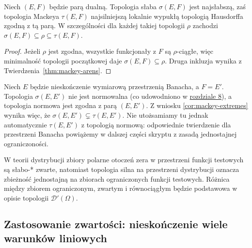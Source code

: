 \begin{wniosek}\label{cor:mackey-extremes}
Niech $(E,F)$ będzie parą dualną. Topologia słaba
$\sigma(E,F)$ jest najsłabszą, zaś topologia Mackeya
$\tau(E,F)$ najsilniejszą lokalnie wypukłą topologią
Hausdorffa zgodną z tą parą. W szczególności dla każdej
takiej topologii $\rho$ zachodzi
$\sigma(E,F)\subseteq\rho\subseteq\tau(E,F)$.
\end{wniosek}
\begin{proof}
Jeżeli $\rho$ jest zgodna, wszystkie funkcjonały z $F$
są $\rho$-ciągłe, więc minimalność topologii początkowej
daje $\sigma(E,F)\subseteq\rho$. Druga inkluzja wynika
z Twierdzenia~\ref{thm:mackey-arens}.
\end{proof}

\begin{przyklad}
Niech $E$ będzie nieskończenie wymiarową przestrzenią Banacha,
a $F=E'$. Topologia $\sigma(E,E')$ nie jest normowalna
(co udowodniono w \hyperref[sec:topologie-slabe]{rozdziale 8}), a topologia normowa
jest zgodna z parą $(E,E')$. Z wniosku
\ref{cor:mackey-extremes} wynika więc, że
$\sigma(E,E')\subsetneq\tau(E,E')$.
Nie utożsamiamy tu jednak automatycznie $\tau(E,E')$
z topologią normową: odpowiednie twierdzenie dla przestrzeni
Banacha powiążemy w dalszej części skryptu z zasadą
jednostajnej ograniczoności.
\end{przyklad}

\begin{uwaga}
W teorii dystrybucji zbiory polarne otoczeń zera w przestrzeni
funkcji testowych są słabo-* zwarte, natomiast topologia silna
na przestrzeni dystrybucji oznacza zbieżność jednostajną
na zbiorach ograniczonych funkcji testowych. Różnica między
zbiorem ograniczonym, zwartym i równociągłym będzie podstawowa
w opisie topologii $\mathcal D'(\Omega)$.
\end{uwaga}

\subsection{Zastosowanie zwartości: nieskończenie wiele warunków liniowych}


